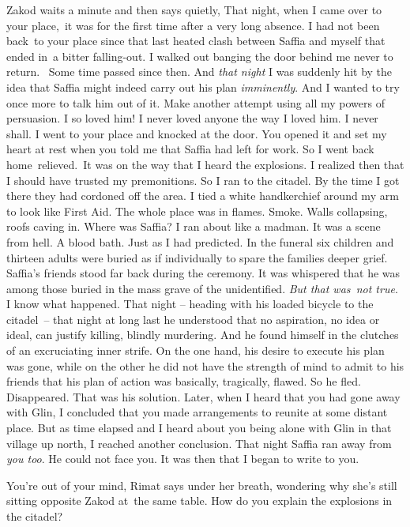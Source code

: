 \documentclass[letterpaper]{article}
\begin{document}
Zakod waits a minute and then says quietly, {\textquotedbl}That night, when I came over to your
place,\textcolor{red}{\ }it was for the first time after a very long absence. I had not been
back\textcolor[rgb]{0.0,0.4392157,0.7529412}{\ }to your place since that last heated clash between Saffia and myself
that ended in~a bitter falling-out. I walked out banging the door behind me never to return. ~Some time passed since
then. And \textit{that night} I was suddenly hit by the idea that Saffia might indeed carry out his plan
\textit{imminently}. And I wanted to try once more to talk him out of it. Make another attempt using all my powers of
persuasion. I so loved him! I never loved anyone the way I loved him. I never shall. I went to your place and knocked
at the door. You opened it and set my heart at rest when you told me that Saffia had left for work. So I went back
home\ relieved.\  It was on the way that I heard the explosions. I realized then that I should have trusted my
premonitions. So I ran to the citadel. By the time I got there they had cordoned off the area. I tied a white
handkerchief around my arm to look like First Aid. The whole place was in flames. Smoke. Walls collapsing, roofs caving
in. Where was Saffia? I ran about like a madman. It was a scene from hell. A blood bath. Just as I had predicted. In
the funeral six children and thirteen adults were buried as if individually to spare the families deeper grief.
Saffia's friends stood far back during the ceremony. It was whispered that he was among those buried in the mass grave
of the unidentified. \textit{But that was~not true}. I know what happened. That night -- heading with his loaded
bicycle to the citadel\ {}-- that night at long last he understood that no aspiration, no idea or ideal, can justify
killing, blindly murdering. And he found himself in the clutches of an excruciating inner strife. On the one hand, his
desire to execute his plan was gone, while on the other he did not have the strength of mind to admit to his friends
that his plan of action was basically, tragically, flawed. So he fled. Disappeared. That was his solution. Later, when
I heard that you had gone away with Glin, I concluded that you made arrangements to reunite at some distant place. But
as time elapsed and I heard about you being alone with Glin in that village up north, I reached another conclusion.
That night Saffia ran away from\textit{ you too}. He could not face you. It was then that I began to write to
you.{\textquotedbl}\ 

{\textquotedbl}You're out of your mind,{\textquotedbl} Rimat says under her breath, wondering why she's still sitting
opposite Zakod at~the same table. {\textquotedbl}How do you explain the explosions in the citadel?{\textquotedbl} 
\end{document}
